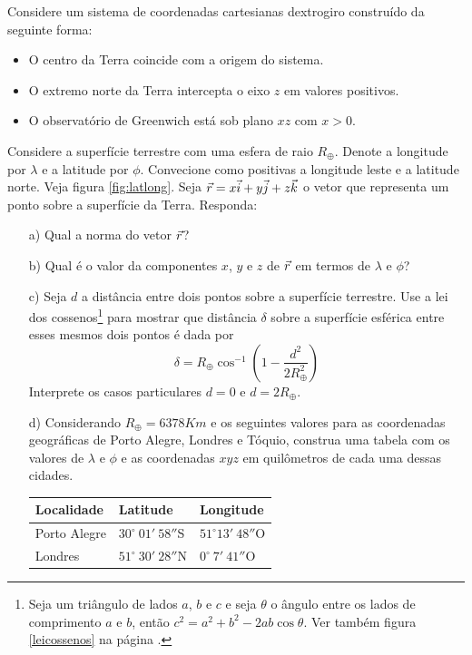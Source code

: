 \begin{prob} 
Considere um sistema de coordenadas cartesianas dextrogiro construído da seguinte forma:

\begin{itemize}
\item O centro da Terra coincide com a origem do sistema.
\item O extremo norte da Terra intercepta o eixo $z$ em valores positivos.
\item O observatório de Greenwich está sob plano $xz$ com $x>0$.
\end{itemize}
Considere a superfície terrestre com uma esfera de raio $R_{\oplus}$. Denote a longitude por $\lambda$ e a latitude por $\phi$. Convecione como positivas a longitude leste  e a latitude norte. Veja figura \ref{fig:latlong}. Seja $\vec{r}=x\vec{i}+y\vec{j}+z\vec{k}$ o vetor que representa um ponto sobre a superfície da Terra. Responda:
\begin{itemize}
\item[a)] Qual a norma do vetor $\vec{r}$?
\item[b)] Qual é o valor da componentes $x$, $y$ e $z$ de $\vec{r}$ em termos de $\lambda$ e $\phi$? 
\item[c)] Seja $d$ a distância entre dois pontos sobre a superfície terrestre. Use a lei dos cossenos\footnote{Seja um triângulo de lados $a$, $b$ e $c$ e seja $\theta$ o ângulo entre os lados de comprimento $a$ e $b$, então $c^2=a^2+b^2-2ab\cos\theta.$ Ver também figura \ref{leicossenos} na página \pageref{leicossenos}.} para mostrar que distância $\delta$ sobre a superfície esférica entre esses mesmos dois pontos é dada por
$$\delta=R_\oplus \cos^{-1}\left(1-\frac{d^2}{2R_\oplus^2}\right)$$
Interprete os casos particulares $d=0$ e $d=2R_\oplus$. 
\item[d)] Considerando $R_\oplus=6378Km$ e os seguintes valores para as coordenadas geográficas de Porto Alegre, Londres e Tóquio, construa uma tabela com os valores de $\lambda$ e $\phi$ e as coordenadas $xyz$ em quilômetros de cada uma dessas cidades.
\begin{table}[h]
	\centering
		\begin{tabular}{|l|l|l|}
		\hline
	  Localidade & Latitude & Longitude\\ 
		\hline
		Porto Alegre & $30^\circ~ 01{'}~58{''}$S & $51^\circ  13{'}~48{''}$O\\ 		
  	\hline
		Londres & $51^\circ~ 30{'}~28{''}$N & $0^\circ~ 7{'}~41{''}$O\\ 		

\end{tabular}
\end{table}
\end{itemize}
\end{prob}
